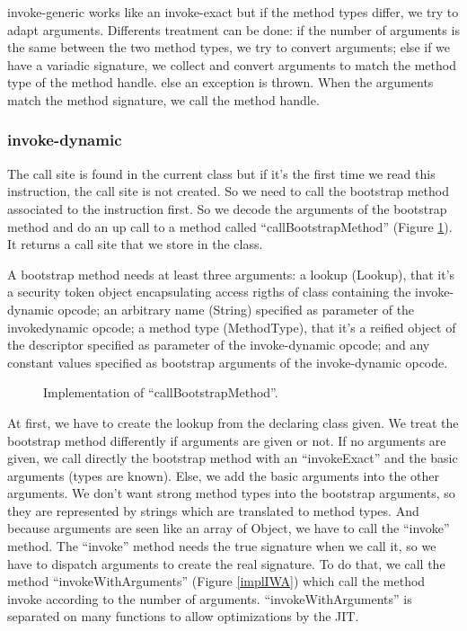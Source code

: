 \documentclass{sig-alternate}
\begin{document}
      invoke-generic works like an invoke-exact but if the method types differ, we try to adapt arguments.
      Differents treatment can be done:
      if the number of arguments is the same between the two method types, we try to convert arguments;
      else if we have a variadic signature, we collect and convert arguments to match the method type of the method handle.
      else an exception is thrown.
      When the arguments match the method signature, we call the method handle.
  
    \subsubsection{invoke-dynamic}
      The call site is found in the current class but if it's the first time we read this instruction, the call site is not created.
      So we need to call the bootstrap method associated to the instruction first.
      So we decode the arguments of the bootstrap method and do an up call to a method called ``callBootstrapMethod'' (Figure \ref{implBSM}).
      It returns a call site that we store in the class.

      A bootstrap method needs at least three arguments:
      a lookup (Lookup), that it's a security token object encapsulating access rigths of class containing the invoke-dynamic opcode;
      an arbitrary name (String) specified as parameter of the invokedynamic opcode;
      a method type (MethodType), that it's a reified object of the descriptor specified as parameter of the invoke-dynamic opcode;
      and any constant values specified as bootstrap arguments of the invoke-dynamic opcode.

      \begin{figure}[!h]
        \centering 
        \caption{Implementation of ``callBootstrapMethod''.}
        \label{implBSM}
      \end{figure}

      At first, we have to create the lookup from the declaring class given.
      We treat the bootstrap method differently if arguments are given or not.
      If no arguments are given, we call directly the bootstrap method
      with an ``invokeExact'' and the basic arguments (types are known).
      Else, we add the basic arguments into the other arguments.
      We don't want strong method types into the bootstrap arguments,
      so they are represented by strings which are translated to method types.
      And because arguments are seen like an array of Object,
      we have to call the ``invoke'' method.
      The ``invoke'' method needs the true signature when we call it,
      so we have to dispatch arguments to create the real signature.
      To do that, we call the method ``invokeWithArguments'' (Figure \ref{implIWA})
      which call the method invoke according to the number of arguments.
      ``invokeWithArguments'' is separated on many functions to allow optimizations by the JIT.
\end{document}
